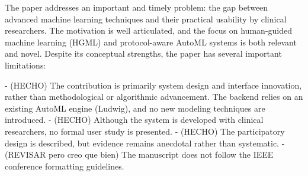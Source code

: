 The paper addresses an important and timely problem: the gap between advanced machine learning techniques and their practical usability by clinical researchers. The motivation is well articulated, and the focus on human-guided machine learning (HGML) and protocol-aware AutoML systems is both relevant and novel. Despite its conceptual strengths, the paper has several important limitations:

- (HECHO) The contribution is primarily system design and interface innovation, rather than methodological or algorithmic advancement. The backend relies on an existing AutoML engine (Ludwig), and no new modeling techniques are introduced.
- (HECHO) Although the system is developed with clinical researchers, no formal user study is presented.
- (HECHO) The participatory design is described, but evidence remains anecdotal rather than systematic.
- (REVISAR pero creo que bien) The manuscript does not follow the IEEE conference formatting guidelines.

